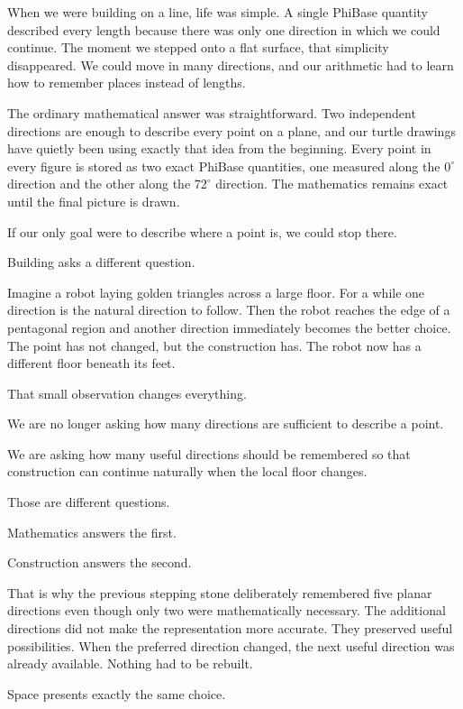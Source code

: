 \label{stone:space}

When we were building on a line, life was simple. A single PhiBase quantity described every length because there was only one direction in which we could continue. The moment we stepped onto a flat surface, that simplicity disappeared. We could move in many directions, and our arithmetic had to learn how to remember places instead of lengths.

The ordinary mathematical answer was straightforward. Two independent directions are enough to describe every point on a plane, and our turtle drawings have quietly been using exactly that idea from the beginning. Every point in every figure is stored as two exact PhiBase quantities, one measured along the \(0^{\circ}\) direction and the other along the \(72^{\circ}\) direction. The mathematics remains exact until the final picture is drawn.

If our only goal were to describe where a point is, we could stop there.

Building asks a different question.

Imagine a robot laying golden triangles across a large floor. For a while one direction is the natural direction to follow. Then the robot reaches the edge of a pentagonal region and another direction immediately becomes the better choice. The point has not changed, but the construction has. The robot now has a different floor beneath its feet.

That small observation changes everything.

We are no longer asking how many directions are sufficient to describe a point.

We are asking how many useful directions should be remembered so that construction can continue naturally when the local floor changes.

Those are different questions.

Mathematics answers the first.

Construction answers the second.

That is why the previous stepping stone deliberately remembered five planar directions even though only two were mathematically necessary. The additional directions did not make the representation more accurate. They preserved useful possibilities. When the preferred direction changed, the next useful direction was already available. Nothing had to be rebuilt.

Space presents exactly the same choice.

